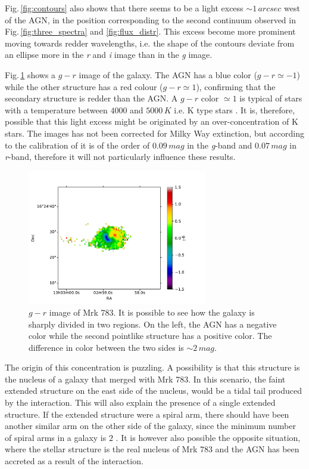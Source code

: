 \documentclass[../main.tex]{subfiles}
\begin{document}
Fig.\,\ref{fig:contours} also shows that there seems to be a light excess $\sim 1\,\si{arcsec}$ west of the AGN, in the position corresponding to the second continuum observed in Fig.\,\ref{fig:three_spectra} and \ref{fig:flux_distr}.
This excess become more prominent moving towards redder wavelengths, i.e. the shape of the contours deviate from an ellipse more in the \emph{r} and \emph{i} image than in the \emph{g} image.

Fig.\,\ref{fig:mrk_gr} shows a $g-r$ image of the galaxy.
The AGN has a blue color ($g-r \simeq -1$) while the other structure has a red colour ($g-r\simeq 1$), confirming that the secondary structure is redder than the AGN.
A $g-r$ color $\simeq 1$ is typical of stars with a temperature between $4000$ and $5000\,\si{K}$ i.e. K type stars \citep{Fukugita11}.
It is, therefore, possible that this light excess might be originated by an over-concentration of K stars.
The images has not been corrected for Milky Way extinction, but according to the calibration of \citet{Schlafly11} it is of the order of $0.09\,\si{mag}$ in the \emph{g}-band and $0.07\,\si{mag}$ in \emph{r}-band, therefore it will not particularly influence these results.

\begin{figure}
\centering
\includegraphics[width=0.7\textwidth]{images/paper3/mrk783color.pdf} 
\caption[]{$g-r$ image of Mrk 783. It is possible to see how the galaxy is sharply divided in two regions. On the left, the AGN has a negative color while the second pointlike structure has a positive color. The difference in color between the two sides is $\sim 2\,\si{mag}$.} 
\label{fig:mrk_gr}
\end{figure} 

The origin of this concentration is puzzling.
A possibility is that this structure is the nucleus of a galaxy that merged with Mrk 783. 
In this scenario, the faint extended structure on the east side of the nucleus, would be a tidal tail produced by the interaction.
This will also explain the presence of a single extended structure.
If the extended structure were a spiral arm, there should have been another similar arm on the other side of the galaxy, since the minimum number of spiral arms in a galaxy is $2$ \citep{Donghia15}.
It is however also possible the opposite situation, where the stellar structure is the real nucleus of Mrk 783 and the AGN has been accreted as a result of the interaction.
\end{document}
